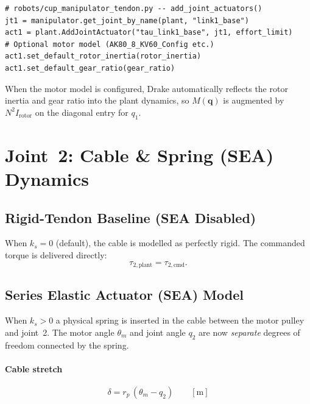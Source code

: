 \documentclass[11pt, a4paper]{article}
\newcommand{\rp}{r_p}
\newcommand{\bq}{\bm{q}}
\begin{document}
\begin{lstlisting}
# robots/cup_manipulator_tendon.py -- add_joint_actuators()
jt1 = manipulator.get_joint_by_name(plant, "link1_base")
act1 = plant.AddJointActuator("tau_link1_base", jt1, effort_limit)
# Optional motor model (AK80_8_KV60_Config etc.)
act1.set_default_rotor_inertia(rotor_inertia)
act1.set_default_gear_ratio(gear_ratio)
\end{lstlisting}

\noindent
When the motor model is configured, Drake automatically reflects the rotor
inertia and gear ratio into the plant dynamics, so $M(\bq)$ is augmented by
$N^2 I_\text{rotor}$ on the diagonal entry for $q_1$.

\section{Joint~2: Cable \& Spring (SEA) Dynamics}

\subsection{Rigid-Tendon Baseline (SEA Disabled)}

When $k_s = 0$ (default), the cable is modelled as perfectly rigid.
The commanded torque is delivered directly:
\begin{equation}
  \tau_{2,\text{plant}} = \tau_{2,\text{cmd}}.
  \label{eq:j2-rigid}
\end{equation}

\subsection{Series Elastic Actuator (SEA) Model}

When $k_s > 0$ a physical spring is inserted in the cable between the motor
pulley and joint~2.  The motor angle $\theta_m$ and joint angle $q_2$ are
now \emph{separate} degrees of freedom connected by the spring.

\paragraph{Cable stretch}
\begin{equation}
  \delta = \rp\,(\theta_m - q_2) \qquad [\text{m}]
  \label{eq:delta}
\end{equation}
\end{document}
